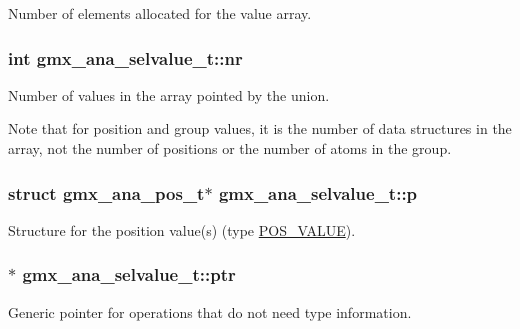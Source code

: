 \-Number of elements allocated for the value array. 

\hypertarget{structgmx__ana__selvalue__t_a80661a78ccd9ecb369adb4c0d4bb2c72}{
\subsubsection[{nr}]{\setlength{\rightskip}{0pt plus 5cm}int {\bf gmx\-\_\-ana\-\_\-selvalue\-\_\-t\-::nr}}}\label{structgmx__ana__selvalue__t_a80661a78ccd9ecb369adb4c0d4bb2c72}


\-Number of values in the array pointed by the union. 

\-Note that for position and group values, it is the number of data structures in the array, not the number of positions or the number of atoms in the group. \hypertarget{structgmx__ana__selvalue__t_a5ac7ec54e9c4bd24a4e1c525eb8ab996}{
\subsubsection[{p}]{\setlength{\rightskip}{0pt plus 5cm}struct {\bf gmx\-\_\-ana\-\_\-pos\-\_\-t}$\ast$ {\bf gmx\-\_\-ana\-\_\-selvalue\-\_\-t\-::p}}}\label{structgmx__ana__selvalue__t_a5ac7ec54e9c4bd24a4e1c525eb8ab996}
\-Structure for the position value(s) (type \hyperlink{share_2template_2gromacs_2selvalue_8h_a70b42b87d434580bf1493591857b8beca31a47fbfbc85ad1472ce3d2a168fd1ec}{\-P\-O\-S\-\_\-\-V\-A\-L\-U\-E}). \hypertarget{structgmx__ana__selvalue__t_a12b279f9954e6c83e9e9957fcde06e81}{
\subsubsection[{ptr}]{$\ast$ {\bf gmx\-\_\-ana\-\_\-selvalue\-\_\-t\-::ptr}}}\label{structgmx__ana__selvalue__t_a12b279f9954e6c83e9e9957fcde06e81}


\-Generic pointer for operations that do not need type information. 

